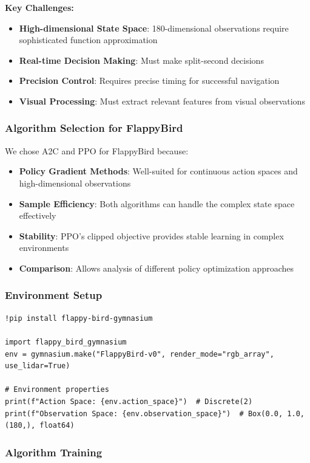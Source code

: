 \documentclass[12pt]{article}
\begin{document}
{{{\textbf{Key Challenges:}
\begin{itemize}
    \item \textbf{High-dimensional State Space}: 180-dimensional observations require sophisticated function approximation
    \item \textbf{Real-time Decision Making}: Must make split-second decisions
    \item \textbf{Precision Control}: Requires precise timing for successful navigation
    \item \textbf{Visual Processing}: Must extract relevant features from visual observations
\end{itemize}

\subsubsection{Algorithm Selection for FlappyBird}

We chose A2C and PPO for FlappyBird because:

\begin{itemize}
    \item \textbf{Policy Gradient Methods}: Well-suited for continuous action spaces and high-dimensional observations
    \item \textbf{Sample Efficiency}: Both algorithms can handle the complex state space effectively
    \item \textbf{Stability}: PPO's clipped objective provides stable learning in complex environments
    \item \textbf{Comparison}: Allows analysis of different policy optimization approaches
\end{itemize}

\subsubsection{Environment Setup}

\begin{verbatim}
!pip install flappy-bird-gymnasium

import flappy_bird_gymnasium
env = gymnasium.make("FlappyBird-v0", render_mode="rgb_array", use_lidar=True)

# Environment properties
print(f"Action Space: {env.action_space}")  # Discrete(2)
print(f"Observation Space: {env.observation_space}")  # Box(0.0, 1.0, (180,), float64)
\end{verbatim}

\subsubsection{Algorithm Training}

}}}
\end{document}
